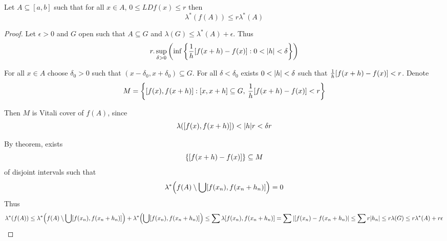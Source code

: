 \begin{lemma}
	Let $A\subseteq [a,b]$ such that for all $x\in A$, $0\leq LD f(x) \leq r$ then
	$$\lambda^*(f(A)) \leq r \lambda^*(A)$$
	\begin{proof}
		Let $\epsilon>0$ and $G$ open such that $A\subseteq G$ and $\lambda(G) \leq \lambda^*(A)+\epsilon$. Thus
		$$r . \sup\limits_{\delta > 0} \qty(\inf \left\{ \frac{1}{h}\qty[f(x+h)-f(x)] : 0 < \abs{h} < \delta  \right\})$$
		
		For all $x\in A$ choose $\delta_0 > 0$ such that $(x-\delta_0,x+\delta_0) \subseteq G$. For all $\delta<\delta_0$ exists $0<\abs{h}<\delta$ such that $\frac{1}{h} \qty[f(x+h) - f(x)] < r$. Denote
		$$M = \left\{ [f(x), f(x+h)] : [x,x+h]\subseteq G,\: \frac{1}{h} \qty[f(x+h) - f(x)] < r \right\}$$
		
		Then $M$ is Vitali cover of $f(A)$, since $$\lambda\qty([f(x), f(x+h)]) < \abs{h} r < \delta r$$
		
		By theorem, exists 
		$$\left\{ \qty[f(x+h) - f(x)]  \right\} \subseteq M$$
		of disjoint intervals such that
		$$\lambda^*\qty(f(A)\setminus \bigcup [f(x_n), f(x_n+h_n)]) = 0$$
		Thus
		$$\lambda^*(f(A)) \leq \lambda^*\qty(f(A)\setminus \bigcup [f(x_n), f(x_n+h_n)]) + \lambda^*\qty(\bigcup [f(x_n), f(x_n+h_n)]) \leq \sum \lambda[f(x_n), f(x_n+h_n)] = \sum \abs{[f(x_n)- f(x_n+h_n)} \leq \sum r \abs{h_n} \leq r\lambda(G) \leq r\lambda^*(A) + r\epsilon$$
	\end{proof}
\end{lemma}

